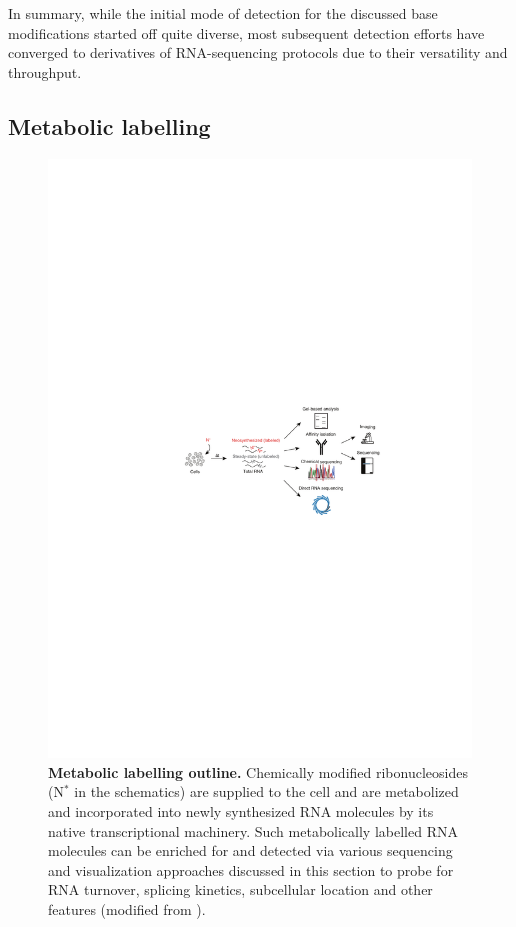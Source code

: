 In summary, while the initial mode of detection for the discussed base modifications started off quite diverse, most subsequent detection efforts have converged to derivatives of RNA-sequencing protocols due to their versatility and throughput.

\subsection{Metabolic labelling}

 \begin{figure}
	 \centering
	 \includegraphics[width=0.9\linewidth]{img/chapter1/metabolic_labelling}
	  \caption[Metabolic labelling outline]{\textbf{Metabolic labelling outline.} Chemically modified ribonucleosides (N$^{*}$ in the schematics) are supplied to the cell and are metabolized and incorporated into newly synthesized RNA molecules by its native transcriptional machinery. Such metabolically labelled RNA molecules can be enriched for and detected via various sequencing and visualization approaches discussed in this section to probe for RNA turnover, splicing kinetics, subcellular location and other features (modified from \citeauthor{Herzog2017} \citep{Herzog2017}).}
	 \label{fig:metabolic_labelling}
\end{figure}

